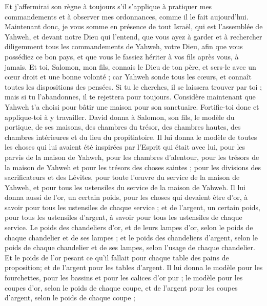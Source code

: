 \begin{multicols}{2}
Et j'affermirai son règne à toujours s'il s'applique à pratiquer mes commandements et à observer mes ordonnances, comme il le fait aujourd'hui.
Maintenant donc, je vous somme en présence de tout Israël, qui est l'assemblée de Yahweh, et devant notre Dieu qui l'entend, que vous ayez à garder et à rechercher diligemment tous les commandements de Yahweh, votre Dieu, afin que vous possédiez ce bon pays, et que vous le fassiez hériter à vos fils après vous, à jamais.
Et toi, Salomon, mon fils, connais le Dieu de ton père, et sers-le avec un cœur droit et une bonne volonté ; car Yahweh sonde tous les cœurs, et connaît toutes les dispositions des pensées. Si tu le cherches, il se laissera trouver par toi ; mais si tu l'abandonnes, il te rejettera pour toujours.
Considère maintenant que Yahweh t'a choisi pour bâtir une maison pour son sanctuaire. Fortifie-toi donc et applique-toi à y travailler.
David donna à Salomon, son fils, le modèle du portique, de ses maisons, des chambres du trésor, des chambres hautes, des chambres intérieures et du lieu du propitiatoire.
Il lui donna le modèle de toutes les choses qui lui avaient été inspirées par l'Esprit qui était avec lui, pour les parvis de la maison de Yahweh, pour les chambres d'alentour, pour les trésors de la maison de Yahweh et pour les trésors des choses saintes ;
pour les divisions des sacrificateurs et des Lévites, pour toute l'œuvre du service de la maison de Yahweh, et pour tous les ustensiles du service de la maison de Yahweh.
Il lui donna aussi de l'or, un certain poids, pour les choses qui devaient être d'or, à savoir pour tous les ustensiles de chaque service ; et de l'argent, un certain poids, pour tous les ustensiles d'argent, à savoir pour tous les ustensiles de chaque service.
Le poids des chandeliers d'or, et de leurs lampes d'or, selon le poids de chaque chandelier et de ses lampes ; et le poids des chandeliers d'argent, selon le poids de chaque chandelier et de ses lampes, selon l’usage de chaque chandelier.
Et le poids de l'or pesant ce qu'il fallait pour chaque table des pains de proposition; et de l'argent pour les tables d'argent.
Il lui donna le modèle pour les fourchettes, pour les bassins et pour les calices d’or pur ; le modèle pour les coupes d'or, selon le poids de chaque coupe,  et de l'argent pour les coupes d'argent, selon le poids de chaque coupe ;

\end{multicols}
